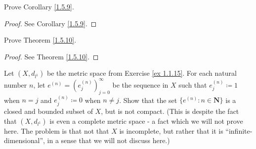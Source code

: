 \begin{exercise}\label{ex 1.5.6}
    Prove Corollary \ref{1.5.9}.
\end{exercise}

\begin{proof}
    See Corollary \ref{1.5.9}.
\end{proof}

\begin{exercise}\label{ex 1.5.7}
    Prove Theorem \ref{1.5.10}.
\end{exercise}

\begin{proof}
    See Theorem \ref{1.5.10}.
\end{proof}

\begin{exercise}\label{ex 1.5.8}
    Let \((X, d_{l^1})\) be the metric space from Exercise \ref{ex 1.1.15}.
    For each natural number \(n\), let \(e^{(n)} = (e_j^{(n)})_{j = 0}^\infty\) be the sequence in \(X\) such that \(e_j^{(n)} \coloneqq 1\) when \(n = j\) and \(e_j^{(n)} \coloneqq 0\) when \(n \neq j\).
    Show that the set \(\{e^{(n)} : n \in \mathbf{N}\}\) is a closed and bounded subset of \(X\), but is not compact.
    (This is despite the fact that \((X, d_{l^1})\) is even a complete metric space
    - a fact which we will not prove here.
    The problem is that not that \(X\) is incomplete, but rather that it is ``infinite-dimensional'', in a sense that we will not discuss here.)
\end{exercise}

